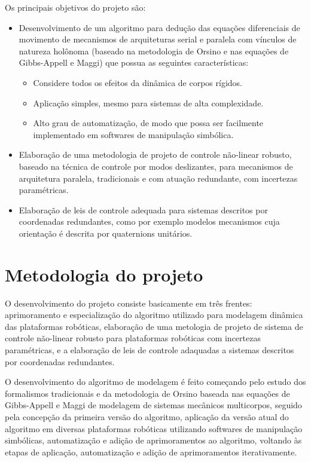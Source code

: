 \documentclass[a4paper,11pt,brazil,fleqn]{article}
\begin{document}
Os principais objetivos do projeto s\~ao:
\begin{itemize}
\item Desenvolvimento de um algoritmo para dedu\c{c}\~ao das equa\c{c}\~oes diferenciais de movimento de mecanismos de arquiteturas serial e paralela com v\'inculos de natureza hol\^onoma (baseado na metodologia de Orsino e nas equa\c{c}\~oes de Gibbs-Appell e Maggi) que possua as seguintes caracter\'isticas:
\begin{itemize}
\item Considere todos os efeitos da din\^amica de corpos r\'igidos.
\item Aplica\c{c}\~ao simples, mesmo para sistemas de alta complexidade.
\item Alto grau de automatiza\c{c}\~ao, de modo que possa ser facilmente implementado em softwares de manipula\c{c}\~ao simb\'olica.
\end{itemize}
\item Elabora\c{c}\~ao de uma metodologia de projeto de controle n\~ao-linear robusto, baseado na t\'ecnica de controle por modos deslizantes, para mecanismos de arquitetura paralela, tradicionais e com atua\c{c}\~ao redundante, com incertezas param\'etricas.
\item Elabora\c{c}\~ao de leis de controle adequada para sistemas descritos por coordenadas redundantes, como por exemplo modelos mecanismos cuja orienta\c{c}\~ao \'e descrita por quaternions unit\'arios.
\end{itemize}

 

\section{Metodologia do projeto}\label{S03}

O desenvolvimento do projeto consiste basicamente em tr\^es frentes: aprimoramento e especializa\c{c}\~ao do algoritmo utilizado para modelagem din\^amica das plataformas rob\'oticas, elabora\c{c}\~ao de uma metologia de projeto de sistema de controle n\~ao-linear robusto para plataformas rob\'oticas com incertezas param\'etricas, e a elabora\c{c}\~ao de leis de controle adaquadas a sistemas descritos por coordenadas redundantes.

O desenvolvimento do algoritmo de modelagem \'e feito come\c{c}ando pelo estudo dos formalismos tradicionais e da metodologia de Orsino baseada nas equa\c{c}\~oes de Gibbs-Appell e Maggi de modelagem de sistemas mec\^anicos multicorpos, seguido pela concep\c{c}\~ao da primeira vers\~ao do algoritmo, aplica\c{c}\~ao da vers\~ao atual do algoritmo em diversas plataformas rob\'oticas utilizando softwares de manipula\c{c}\~ao simb\'olicas, automatiza\c{c}\~ao e adi\c{c}\~ao de aprimoramentos ao algoritmo, voltando \`as etapas de aplica\c{c}\~ao, automatiza\c{c}\~ao e adi\c{c}\~ao de aprimoramentos iterativamente.
\end{document}
